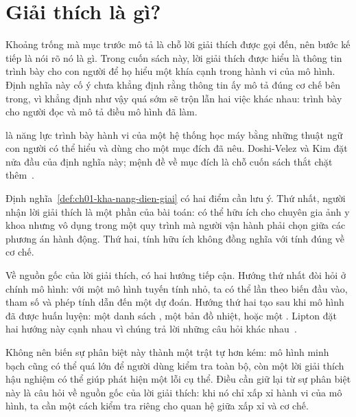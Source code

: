 \section{Giải thích là gì?}
\label{sec:ch01-giai-thich-la-gi}

%
Khoảng trống mà mục trước mô tả là chỗ lời giải thích được gọi đến, nên bước
kế tiếp là nói rõ nó là gì. Trong cuốn sách này, lời giải thích được hiểu là
thông tin trình bày cho con người để họ hiểu một khía cạnh trong hành vi của
mô hình. Định nghĩa này cố ý
chưa khẳng định rằng thông tin ấy mô tả đúng cơ chế bên trong, vì khẳng định
như vậy quá sớm sẽ trộn lẫn hai việc khác nhau: trình bày cho người đọc và mô
tả điều mô hình đã làm.

\begin{definition}
\label{def:ch01-kha-nang-dien-giai}
 là năng lực trình bày hành vi của
một hệ thống học máy bằng những thuật ngữ con người có thể hiểu và dùng cho
một mục đích đã nêu. Doshi-Velez và Kim đặt nửa đầu của định nghĩa này; mệnh
đề về mục đích là chỗ cuốn sách thắt chặt thêm~\autocite{p14rigorous}.
\end{definition}

%
Định nghĩa~\ref{def:ch01-kha-nang-dien-giai} có hai điểm cần lưu ý. Thứ nhất,
người nhận lời giải thích là một phần của bài toán:  có thể hữu
ích cho chuyên gia ảnh y khoa nhưng vô dụng trong một quy trình mà người vận
hành phải chọn giữa các phương án hành động. Thứ hai, tính hữu ích không đồng
nghĩa với tính đúng về cơ chế.

%
%
Về nguồn gốc của lời giải thích, có hai hướng tiếp cận. Hướng thứ nhất đòi
hỏi  ở chính mô hình: với một mô hình tuyến tính
nhỏ, ta có thể lần theo biến đầu vào, tham số và phép tính dẫn đến một dự
đoán. Hướng thứ hai tạo  sau
khi mô hình đã được huấn luyện: một danh sách , một bản đồ nhiệt,
hoặc một . Lipton đặt hai hướng này cạnh nhau vì chúng
trả lời những câu hỏi khác nhau~\autocite{p13mythos}.

Không nên biến sự phân biệt này thành một trật tự hơn kém: mô hình minh bạch
cũng có thể quá lớn để người dùng kiểm tra toàn bộ, còn một lời giải thích
hậu nghiệm có thể giúp phát hiện một lỗi cụ thể. Điều cần giữ lại từ sự phân
biệt này là câu hỏi về nguồn gốc của lời giải thích: khi nó chỉ xấp xỉ hành
vi của mô hình, ta cần một cách kiểm tra riêng cho quan hệ giữa xấp xỉ và cơ
chế.

%
